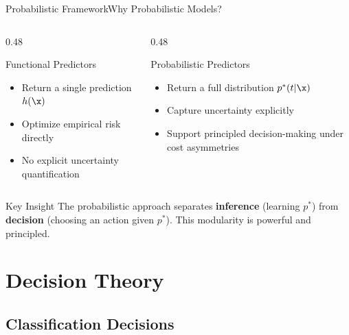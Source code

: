 \begin{frame}{Probabilistic Framework}{Why Probabilistic Models?}
  \begin{columns}
    \begin{column}{0.48\textwidth}
      \begin{block}{Functional Predictors}
        \begin{itemize}
          \item Return a single prediction $h(\x)$
          \item Optimize empirical risk directly
          \item No explicit uncertainty quantification
        \end{itemize}
      \end{block}
    \end{column}
    \begin{column}{0.48\textwidth}
      \begin{alertblock}{Probabilistic Predictors}
        \begin{itemize}
          \item Return a full distribution $p^*(t|\x)$
          \item Capture uncertainty explicitly
          \item Support principled decision-making under cost asymmetries
        \end{itemize}
      \end{alertblock}
    \end{column}
  \end{columns}

  \bigskip
  \begin{exampleblock}{Key Insight}
    The probabilistic approach separates \textbf{inference} (learning $p^*$) from \textbf{decision} (choosing an action given $p^*$). This modularity is powerful and principled.
  \end{exampleblock}
\end{frame}

\section{Decision Theory}

\subsection{Classification Decisions}

